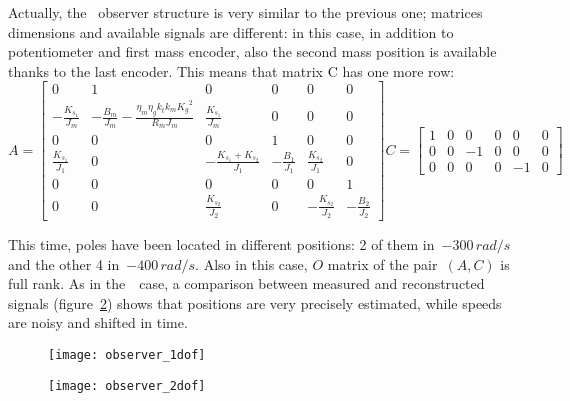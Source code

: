 Actually, the \twodof\ observer structure is very similar to the previous one; matrices dimensions and available signals are different: in this case, in addition to potentiometer and first mass encoder, also the second mass position is available thanks to the last encoder. This means that matrix C has one more row:
\begin{equation}
	A = 
	\begin{bmatrix}
		0 &1 & 0 & 0 & 0 & 0 \\
		-\frac{K_{s_1}}{J_m} & -\frac{B_m}{J_m}-\frac{\eta_m \eta_g k_t k_m {K_g}^2}{R_m J_m}  & \frac{K_{s_1}}{J_m} & 0 & 0 & 0 \\
		0 & 0 & 0 & 1 & 0 & 0 \\
		\frac{K_{s_1}}{J_1} & 0 & -\frac{K_{s_1}+K_{s_2}}{J_1} & -\frac{B_1}{J_1} & \frac{K_{s_2}}{J_1} & 0 \\
		0 & 0 & 0 & 0 & 0 & 1 \\
		0 & 0 & \frac{K_{s_2}}{J_2} & 0 & -\frac{K_{s_2}}{J_2} & -\frac{B_2}{J_2}
	\end{bmatrix}
	C =
	\begin{bmatrix}
		1 & 0 & 0 & 0 & 0 & 0 \\
		0 & 0 & -1 & 0 & 0 & 0  \\
		0 & 0 & 0 & 0 & -1 & 0
	\end{bmatrix}
\label{eqn:2dof_mat_obs}
\end{equation}

This time, poles have been located in different positions: 2 of them in~$-300 \, rad/s$ and the other 4 in~$-400 \, rad/s$. Also in this case, $\mathit{O}$ matrix of the pair~$(A,C)$ is full rank. As in the~\onedof\ case, a comparison between measured and reconstructed signals (figure~\ref{fig:observer_2dof}) shows that positions are very precisely estimated, while speeds are noisy and shifted in time.

\begin{figure*}
	\centering
	\begin{subfigure}{0.45\columnwidth}
		\texttt{[image: observer\_1dof]}
		\label{fig:observer_1dof}
	\end{subfigure}
	\begin{subfigure}{0.45\columnwidth}
		\texttt{[image: observer\_2dof]}
		\label{fig:observer_2dof}
	\end{subfigure}
	\caption{Observer reconstruction compared to available measurements}
\end{figure*}


